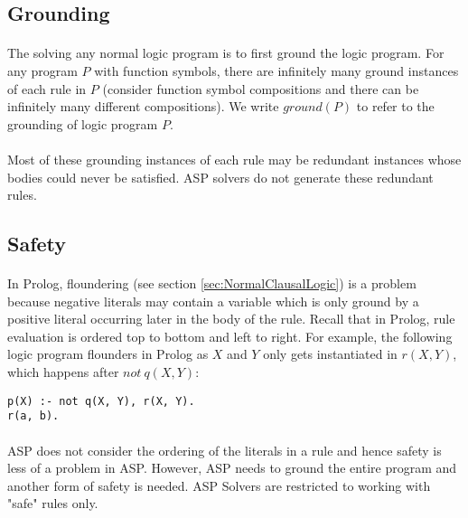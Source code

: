 \documentclass{article}
\theoremstyle{plain}
\theoremstyle{definition}
\begin{document}
\begin{multicols}{2}
\subsection{Grounding}

\paragraph{} The solving any normal logic program is to first ground the logic program. For any program $P$ with function symbols, there are infinitely many ground instances of each rule in $P$ (consider function symbol compositions and there can be infinitely many different compositions). We write $ground(P)$ to refer to the grounding of logic program $P$.

\paragraph{} Most of these grounding instances of each rule may be redundant instances whose bodies could never be satisfied. ASP solvers do not generate these redundant rules.

\subsection{Safety}

\paragraph{} In Prolog, floundering (see section \ref{sec:NormalClausalLogic}) is a problem because negative literals may contain a variable which is only ground by a positive literal occurring later in the body of the rule. Recall that in Prolog, rule evaluation is ordered top to bottom and left to right. For example, the following logic program flounders in Prolog as $X$ and $Y$ only gets instantiated in $r(X, Y)$, which happens after $not\ q(X, Y)$:

\begin{lstlisting}
p(X) :- not q(X, Y), r(X, Y).
r(a, b).
\end{lstlisting}

\paragraph{} ASP does not consider the ordering of the literals in a rule and hence safety is less of a problem in ASP.  However, ASP needs to ground the entire program and another form of safety is needed. ASP Solvers are restricted to working with "safe" rules only.


\end{multicols}
\end{document}
